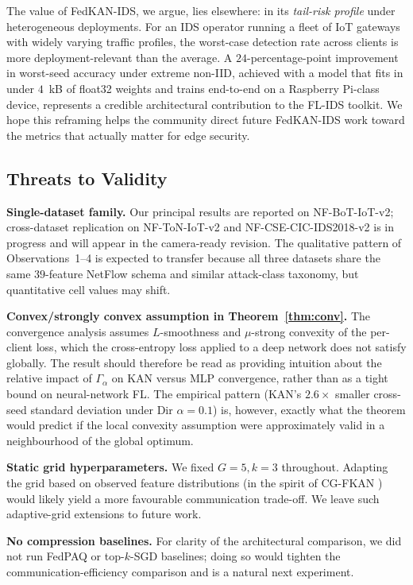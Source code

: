 The value of FedKAN-IDS, we argue, lies elsewhere: in its \emph{tail-risk profile} under heterogeneous deployments. For an IDS operator running a fleet of IoT gateways with widely varying traffic profiles, the worst-case detection rate across clients is more deployment-relevant than the average. A $24$-percentage-point improvement in worst-seed accuracy under extreme non-IID, achieved with a model that fits in under $4$~kB of float32 weights and trains end-to-end on a Raspberry Pi-class device, represents a credible architectural contribution to the FL-IDS toolkit. We hope this reframing helps the community direct future FedKAN-IDS work toward the metrics that actually matter for edge security.

\subsection{Threats to Validity}

\textbf{Single-dataset family.} Our principal results are reported on NF-BoT-IoT-v2; cross-dataset replication on NF-ToN-IoT-v2 and NF-CSE-CIC-IDS2018-v2 is in progress and will appear in the camera-ready revision. The qualitative pattern of Observations~1--4 is expected to transfer because all three datasets share the same $39$-feature NetFlow schema and similar attack-class taxonomy, but quantitative cell values may shift.

\textbf{Convex/strongly convex assumption in Theorem~\ref{thm:conv}.} The convergence analysis assumes $L$-smoothness and $\mu$-strong convexity of the per-client loss, which the cross-entropy loss applied to a deep network does not satisfy globally. The result should therefore be read as providing intuition about the relative impact of $\Gamma_\alpha$ on KAN versus MLP convergence, rather than as a tight bound on neural-network FL. The empirical pattern (KAN's $2.6\times$ smaller cross-seed standard deviation under Dir $\alpha = 0.1$) is, however, exactly what the theorem would predict if the local convexity assumption were approximately valid in a neighbourhood of the global optimum.

\textbf{Static grid hyperparameters.} We fixed $G = 5, k = 3$ throughout. Adapting the grid based on observed feature distributions (in the spirit of CG-FKAN \cite{yu2025cgfkan}) would likely yield a more favourable communication trade-off. We leave such adaptive-grid extensions to future work.

\textbf{No compression baselines.} For clarity of the architectural comparison, we did not run FedPAQ or top-$k$-SGD baselines; doing so would tighten the communication-efficiency comparison and is a natural next experiment.

